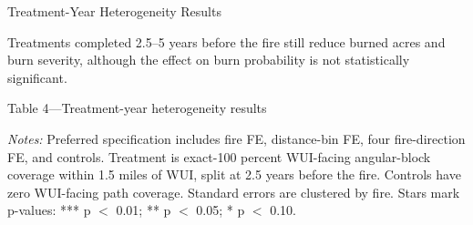 \documentclass[10pt,aspectratio=169]{beamer}
\begin{document}
\begin{frame}{Treatment-Year Heterogeneity Results}
  
  Treatments completed 2.5--5 years before the fire still reduce burned acres and burn severity, although the effect on burn probability is not statistically significant.

  \vspace{0.2em}
  {\centering\small Table 4---Treatment-year heterogeneity results\par}

  \vspace{0.25em}
  \small
  \setlength{\tabcolsep}{5pt}
  \renewcommand{\arraystretch}{1.12}

  \vspace{0.35em}
  \begin{minipage}{0.86\textwidth}
    \tiny
    \textit{Notes:} Preferred specification includes fire FE, distance-bin FE, four fire-direction FE, and controls. Treatment is exact-100 percent WUI-facing angular-block coverage within 1.5 miles of WUI, split at 2.5 years before the fire. Controls have zero WUI-facing path coverage. Standard errors are clustered by fire. Stars mark p-values: *** p $<$ 0.01; ** p $<$ 0.05; * p $<$ 0.10.
  \end{minipage}
  \renewcommand{\arraystretch}{1}
\end{frame}
\end{document}
